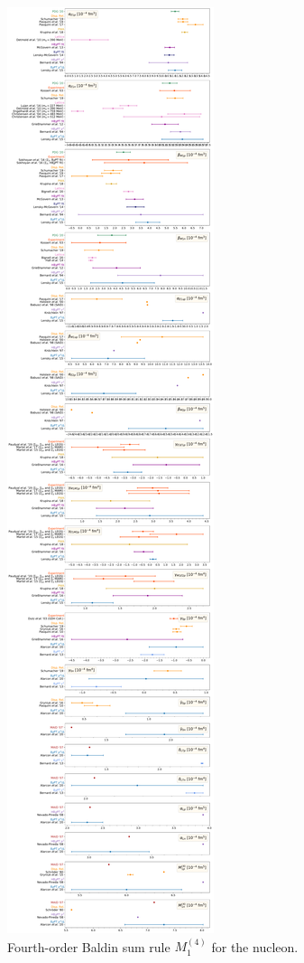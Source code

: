 \documentclass[preprints,review,accept,moreauthors,pdftex]{Definitions/mdpi}
\begin{document}
\begin{figure}[t]
\centering
\includegraphics[viewport=0 0 1115 402,clip,width=\columnwidth]{Figures/AllPolarizabilities05.pdf}
\caption{Fourth-order Baldin sum rule $M_1^{(4)}$ for the nucleon. \label{Badlin4Pol}}
\end{figure} 
\end{document}
